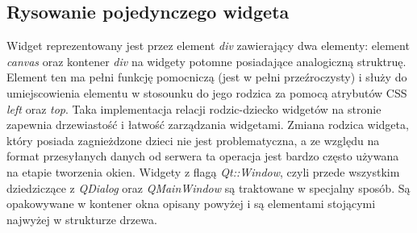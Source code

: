 \subsection{Rysowanie pojedynczego widgeta}
Widget reprezentowany jest przez element \emph{div} zawierający dwa elementy: element \emph{canvas} oraz kontener \emph{div} na widgety potomne posiadające analogiczną struktruę. Element ten ma pełni funkcję pomocniczą (jest w pełni przeźroczysty) i służy do umiejscowienia elementu w stosounku do jego rodzica za pomocą atrybutów CSS \emph{left} oraz \emph{top}. Taka implementacja relacji rodzic-dziecko widgetów na stronie zapewnia drzewiastość i łatwość zarządzania widgetami. Zmiana rodzica widgeta, który posiada zagnieżdzone dzieci nie jest problematyczna, a ze względu na format przesyłanych danych od serwera ta operacja jest bardzo często używana na etapie tworzenia okien.
Widgety z flagą \emph{Qt::Window}, czyli przede wszystkim dziedziczące z \emph{QDialog} oraz \emph{QMainWindow} są traktowane w specjalny sposób. Są opakowywane w kontener okna opisany powyżej i są elementami stojącymi najwyżej w strukturze drzewa.